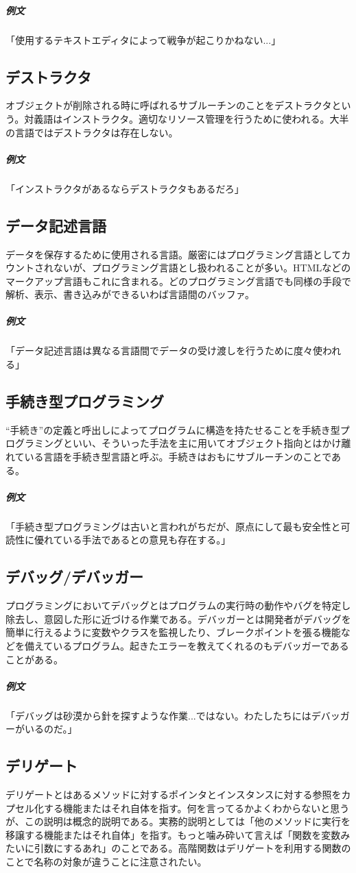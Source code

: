 \documentclass[a4paper]{ltjsreport}
\begin{document}
\subparagraph{例文}「使用するテキストエディタによって戦争が起こりかねない...」

\subsection{デストラクタ}
オブジェクトが削除される時に呼ばれるサブルーチンのことをデストラクタという。対義語はインストラクタ。適切なリソース管理を行うために使われる。大半の言語ではデストラクタは存在しない。

\subparagraph{例文}「インストラクタがあるならデストラクタもあるだろ」

\subsection{データ記述言語}
データを保存するために使用される言語。厳密にはプログラミング言語としてカウントされないが、プログラミング言語とし扱われることが多い。HTMLなどのマークアップ言語もこれに含まれる。どのプログラミング言語でも同様の手段で解析、表示、書き込みができるいわば言語間のバッファ。

\subparagraph{例文}「データ記述言語は異なる言語間でデータの受け渡しを行うために度々使われる」

\subsection{手続き型プログラミング}
``手続き''の定義と呼出しによってプログラムに構造を持たせることを手続き型プログラミングといい、そういった手法を主に用いてオブジェクト指向とはかけ離れている言語を手続き型言語と呼ぶ。手続きはおもにサブルーチンのことである。

\subparagraph{例文}「手続き型プログラミングは古いと言われがちだが、原点にして最も安全性と可読性に優れている手法であるとの意見も存在する。」

\subsection{デバッグ/デバッガー}
プログラミングにおいてデバッグとはプログラムの実行時の動作やバグを特定し除去し、意図した形に近づける作業である。デバッガーとは開発者がデバッグを簡単に行えるように変数やクラスを監視したり、ブレークポイントを張る機能などを備えているプログラム。起きたエラーを教えてくれるのもデバッガーであることがある。

\subparagraph{例文}「デバッグは砂漠から針を探すような作業...ではない。わたしたちにはデバッガーがいるのだ。」

\subsection{デリゲート}
デリゲートとはあるメソッドに対するポインタとインスタンスに対する参照をカプセル化する機能またはそれ自体を指す。何を言ってるかよくわからないと思うが、この説明は概念的説明である。実務的説明としては「他のメソッドに実行を移譲する機能またはそれ自体」を指す。もっと噛み砕いて言えば「関数を変数みたいに引数にするあれ」のことである。高階関数はデリゲートを利用する関数のことで名称の対象が違うことに注意されたい。
\end{document}
